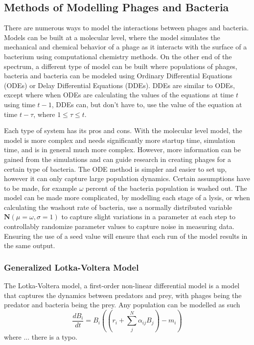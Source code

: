 \subsection{Methods of Modelling Phages and Bacteria}
There are numerous ways to model the interactions between phages and bacteria. Models can be built at a molecular level, where the model simulates the mechanical and chemical behavior of a phage as it interacts with the surface of a bacterium using computational chemistry methods. On the other end of the spectrum, a different type of model can be built where populations of phages, bacteria and bacteria can be modeled using Ordinary Differential Equations (ODEs) or Delay Differential Equations (DDEs). DDEs are similar to ODEs, except where when ODEs are calculating the values of the equations at time $t$ using time $t-1$, DDEs can, but don't have to, use the value of the equation at time $t-\tau$, where $1 \leq \tau \leq t$. \newline 

Each type of system has its pros and cons. With the molecular level model, the model is more complex and needs significantly more startup time, simulation time, and is in general much more complex. However, more information can be gained from the simulations and can guide research in creating phages for a certain type of bacteria. The ODE method is simpler and easier to set up, however it can only capture large population dynamics. Certain assumptions have to be made, for example $\omega$ percent of the bacteria population is washed out. The model can be made more complicated, by modelling each stage of a lysis, or when calculating the washout rate of bacteria, use a normally distributed variable $\textbf{N}(\mu=\omega, \sigma=1)$ to capture slight variations in a parameter at each step to controllably randomize parameter values to capture noise in measuring data. Ensuring the use of a seed value will ensure that each run of the model results in the same output. 

\subsubsection{Generalized Lotka-Voltera Model}
The Lotka-Voltera model, a first-order non-linear differential model is a model that captures the dynamics between predators and prey, with phages being the predator and bacteria being the prey. Any population can be modelled as such
\[ 
    \frac{d{B}_i}{dt} = {B}_i \left(\left(r_i + \sum_{j}^{N} \alpha_{ij}{B}_j \right) - m_i\right)
\]
where ... there is a typo. 

